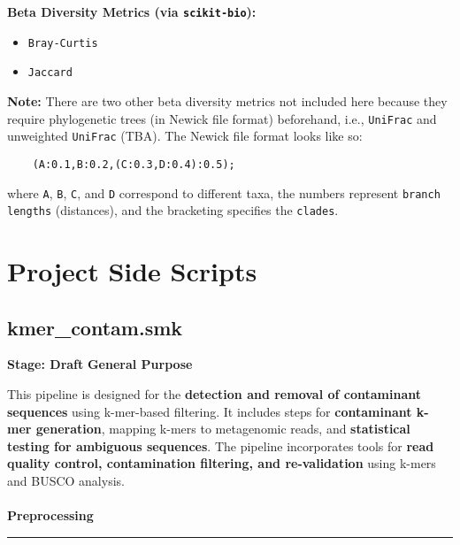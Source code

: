 \documentclass[11pt]{report}
\begin{document}
{\begin{multicols}{2}
	\textbf{Beta Diversity Metrics (via \texttt{scikit-bio}):}
	\begin{itemize}
		\item \texttt{Bray-Curtis}
		\item \texttt{Jaccard} 
	\end{itemize}
\end{multicols}

\textbf{Note:} There are two other beta diversity metrics not included here because they require phylogenetic trees (in Newick file format) beforehand, i.e., \texttt{UniFrac} and unweighted \texttt{UniFrac} (TBA). The Newick file format looks like so:
\begin{verbatim}
	(A:0.1,B:0.2,(C:0.3,D:0.4):0.5);
\end{verbatim}
where \texttt{A}, \texttt{B}, \texttt{C}, and \texttt{D} correspond to different taxa, the numbers represent \texttt{branch lengths} (distances), and the bracketing specifies the \texttt{clades}.






\newpage

\pagestyle{fancy}
\fancyhf{}
\fancyhead[C]{\leftmark}  %
\fancyhead[R]{\thepage}

\setcounter{section}{0}
\setcounter{subsection}{0}

\linenumbers*



\chapter{Project Side Scripts}
\section{kmer\_contam.smk}
\textbf{Stage: Draft}
\textbf{General Purpose}

This pipeline is designed for the \textbf{detection and removal of contaminant sequences} using k-mer-based filtering. It includes steps for \textbf{contaminant k-mer generation}, mapping k-mers to metagenomic reads, and \textbf{statistical testing for ambiguous sequences}. The pipeline incorporates tools for \textbf{read quality control, contamination filtering, and re-validation} using k-mers and BUSCO analysis.
\\
\\ \textbf{Preprocessing} \\ \rule{\linewidth}{0.5mm} 

}
\end{document}
